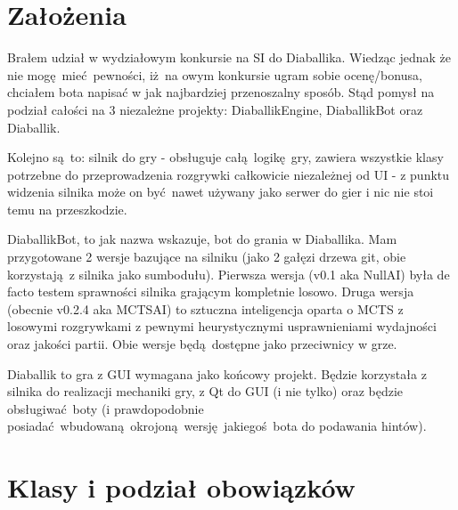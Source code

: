 \documentclass[a4paper,12pt]{article}
\begin{document}
\section{Założenia}
Brałem udział w wydziałowym konkursie na SI do Diaballika. Wiedząc jednak że nie mogę mieć pewności, iż na owym konkursie ugram sobie ocenę/bonusa,
chciałem bota napisać w jak najbardziej przenoszalny sposób. Stąd pomysł na podział całości na 3 niezależne projekty: DiaballikEngine, DiaballikBot
oraz Diaballik. 

Kolejno są to: silnik do gry - obsługuje całą logikę gry, zawiera wszystkie klasy potrzebne do przeprowadzenia rozgrywki całkowicie
niezależnej od UI - z punktu widzenia silnika może on być nawet używany jako serwer do gier i nic nie stoi temu na przeszkodzie. 

DiaballikBot, to jak nazwa wskazuje, bot do grania w Diaballika. Mam przygotowane 2 wersje bazujące na silniku (jako 2 gałęzi drzewa git, obie 
korzystają z silnika jako sumbodułu). Pierwsza wersja (v0.1 aka NullAI) była de facto testem sprawności silnika grającym kompletnie losowo. 
Druga wersja (obecnie v0.2.4 aka MCTSAI) to sztuczna inteligencja oparta o MCTS z losowymi rozgrywkami z pewnymi heurystycznymi usprawnieniami 
wydajności oraz jakości partii. Obie wersje będą dostępne jako przeciwnicy w grze.

Diaballik to gra z GUI wymagana jako końcowy projekt. Będzie korzystała z silnika do realizacji mechaniki gry, z Qt do GUI (i nie tylko) oraz będzie
obsługiwać boty (i prawdopodobnie posiadać wbudowaną okrojoną wersję jakiegoś bota do podawania hintów).

\section{Klasy i podział obowiązków}
\end{document}

